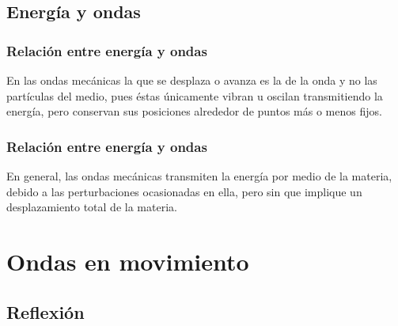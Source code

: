 \documentclass[14pt]{beamer}
\begin{document}
\subsection{Energía y ondas}

\begin{frame}
\frametitle{Relación entre energía y ondas}
En las ondas mecánicas la que se desplaza o avanza es la  de la onda y no las partículas del medio, pues éstas únicamente vibran u oscilan transmitiendo la energía, pero conservan sus posiciones alrededor de puntos más o menos fijos.
\end{frame}
\begin{frame}
\frametitle{Relación entre energía y ondas}    
En general, las ondas mecánicas transmiten la energía por medio de la materia, debido a las perturbaciones ocasionadas en ella, pero sin que implique un desplazamiento total de la materia.
\end{frame}


\section{Ondas en movimiento}
\subsection{Reflexión}
\end{document}
